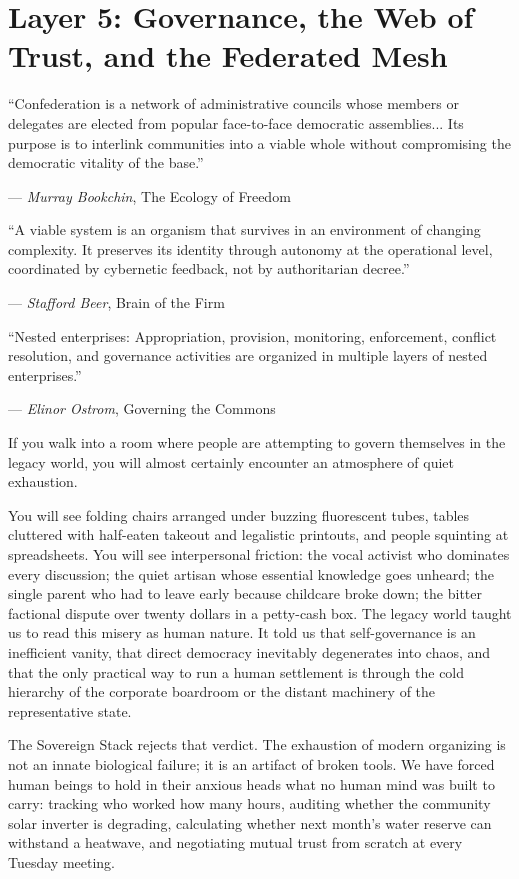 \chapter[Layer 5: Governance and the Federated Mesh]{Layer 5: Governance, the Web of Trust, and the Federated Mesh}
\label{chap:layer5_governance}

\epigraph{
    ``Confederation is a network of administrative councils whose members or delegates are elected from popular face-to-face democratic assemblies... Its purpose is to interlink communities into a viable whole without compromising the democratic vitality of the base.''
}{--- \textit{Murray Bookchin}, \textnormal{The Ecology of Freedom} \parencite{bookchin1982}}

\epigraph{
    ``A viable system is an organism that survives in an environment of changing complexity. It preserves its identity through autonomy at the operational level, coordinated by cybernetic feedback, not by authoritarian decree.''
}{--- \textit{Stafford Beer}, \textnormal{Brain of the Firm} \parencite{beer1972}}

\epigraph{
    ``Nested enterprises: Appropriation, provision, monitoring, enforcement, conflict resolution, and governance activities are organized in multiple layers of nested enterprises.''
}{--- \textit{Elinor Ostrom}, \textnormal{Governing the Commons} \parencite{ostrom1990}}

If you walk into a room where people are attempting to govern themselves in the legacy world, you will almost certainly encounter an atmosphere of quiet exhaustion.

You will see folding chairs arranged under buzzing fluorescent tubes, tables cluttered with half-eaten takeout and legalistic printouts, and people squinting at spreadsheets. You will see interpersonal friction: the vocal activist who dominates every discussion; the quiet artisan whose essential knowledge goes unheard; the single parent who had to leave early because childcare broke down; the bitter factional dispute over twenty dollars in a petty-cash box. The legacy world taught us to read this misery as human nature. It told us that self-governance is an inefficient vanity, that direct democracy inevitably degenerates into chaos, and that the only practical way to run a human settlement is through the cold hierarchy of the corporate boardroom or the distant machinery of the representative state.

The Sovereign Stack rejects that verdict. The exhaustion of modern organizing is not an innate biological failure; it is an artifact of broken tools. We have forced human beings to hold in their anxious heads what no human mind was built to carry: tracking who worked how many hours, auditing whether the community solar inverter is degrading, calculating whether next month's water reserve can withstand a heatwave, and negotiating mutual trust from scratch at every Tuesday meeting.

